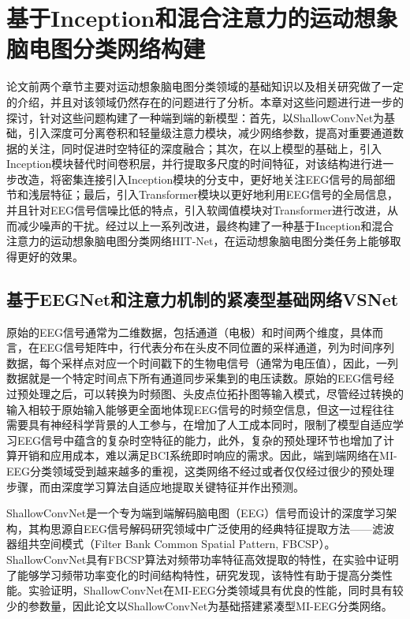 
\chapter{基于Inception和混合注意力的运动想象脑电图分类网络构建}

论文前两个章节主要对运动想象脑电图分类领域的基础知识以及相关研究做了一定的介绍，并且对该领域仍然存在的问题进行了分析。本章对这些问题进行进一步的探讨，针对这些问题构建了一种端到端的新模型：首先，以ShallowConvNet为基础，引入深度可分离卷积和轻量级注意力模块，减少网络参数，提高对重要通道数据的关注，同时促进时空特征的深度融合；其次，在以上模型的基础上，引入Inception模块替代时间卷积层，并行提取多尺度的时间特征，对该结构进行进一步改造，将密集连接引入Inception模块的分支中，更好地关注EEG信号的局部细节和浅层特征；最后，引入Transformer模块以更好地利用EEG信号的全局信息，并且针对EEG信号信噪比低的特点，引入软阈值模块对Transformer进行改进，从而减少噪声的干扰。经过以上一系列改进，最终构建了一种基于Inception和混合注意力的运动想象脑电图分类网络HIT-Net，在运动想象脑电图分类任务上能够取得更好的效果。

\section{基于EEGNet和注意力机制的紧凑型基础网络VSNet}

原始的EEG信号通常为二维数据，包括通道（电极）和时间两个维度，具体而言，在EEG信号矩阵中，行代表分布在头皮不同位置的采样通道，列为时间序列数据，每个采样点对应一个时间戳下的生物电信号（通常为电压值），因此，一列数据就是一个特定时间点下所有通道同步采集到的电压读数。原始的EEG信号经过预处理之后，可以转换为时频图、头皮点位拓扑图等输入模式，尽管经过转换的输入相较于原始输入能够更全面地体现EEG信号的时频空信息，但这一过程往往需要具有神经科学背景的人工参与，在增加了人工成本同时，限制了模型自适应学习EEG信号中蕴含的复杂时空特征的能力，此外，复杂的预处理环节也增加了计算开销和应用成本，难以满足BCI系统即时响应的需求。因此，端到端网络在MI-EEG分类领域受到越来越多的重视，这类网络不经过或者仅仅经过很少的预处理步骤，而由深度学习算法自适应地提取关键特征并作出预测。

ShallowConvNet\cite{schirrmeister2017deep}是一个专为端到端解码脑电图（EEG）信号而设计的深度学习架构，其构思源自EEG信号解码研究领域中广泛使用的经典特征提取方法——滤波器组共空间模式（Filter Bank Common Spatial Pattern, FBCSP）\cite{ang2008filter}。ShallowConvNet具有FBCSP算法对频带功率特征高效提取的特性，在实验中证明了能够学习频带功率变化的时间结构特性\cite{schirrmeister2017deep}，研究发现，该特性有助于提高分类性能\cite{sakhavi2015parallel}。实验证明，ShallowConvNet在MI-EEG分类领域具有优良的性能\cite{lawhern2018eegnet}，同时具有较少的参数量，因此论文以ShallowConvNet为基础搭建紧凑型MI-EEG分类网络。

